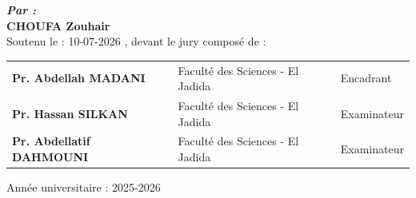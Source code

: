 \begin{titlepage}
\begin{center}
{\large \textit{\textbf{Par :}}}\\[0.3cm]
{\large \textbf{CHOUFA Zouhair}}\\[1cm]

Soutenu le : 10-07-2026 , devant le jury composé de :\\[0.8cm]

{\small
\setlength{\tabcolsep}{6pt}%
\begin{tabular}{p{5.5cm} p{6cm} p{2cm}}
    \raggedright\textbf{Pr. Abdellah MADANI} & \raggedright\arraybackslash Faculté des Sciences - El Jadida & \raggedright\arraybackslash Encadrant \\
    \raggedright\textbf{Pr. Hassan SILKAN} & \raggedright\arraybackslash Faculté des Sciences - El Jadida & \raggedright\arraybackslash Examinateur \\
    \raggedright\textbf{Pr. Abdellatif DAHMOUNI} & \raggedright\arraybackslash Faculté des Sciences - El Jadida & \raggedright\arraybackslash Examinateur \\
\end{tabular}}
\vspace{1cm}
\vfill
Année universitaire : 2025-2026
\end{center}
\end{titlepage}